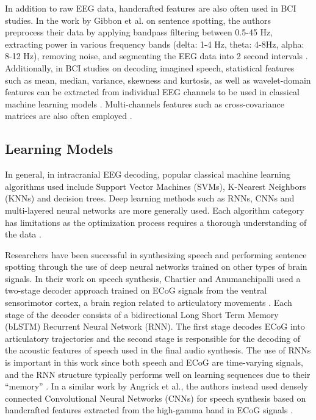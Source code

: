 \documentclass[format=sigconf, nonacm=true, review=false, screen=true]{acmart}
\begin{document}
In addition to raw EEG data, handcrafted features are also often used in BCI studies. In the work by Gibbon et al. on sentence spotting, the authors preprocess their data by applying bandpass filtering between 0.5-45 Hz, extracting power in various frequency bands (delta: 1-4 Hz, theta: 4-8Hz, alpha: 8-12 Hz), removing noise, and segmenting the EEG data into 2 second intervals \cite{gibbon2021machine}. Additionally, in BCI studies on decoding imagined speech, statistical features such as mean, median, variance, skewness and kurtosis, as well as wavelet-domain features can be extracted from individual EEG channels to be used in classical machine learning models \cite{panachakel2021}. Multi-channels features such as cross-covariance matrices are also often employed \cite{panachakel2021}.

\subsection{Learning Models}

In general, in intracranial EEG decoding, popular classical machine learning algorithms used include Support Vector Machines (SVMs), K-Nearest Neighbors (KNNs) and decision trees. Deep learning methods such as RNNs, CNNs and multi-layered neural networks are more generally used. Each algorithm category has limitations as the optimization process requires a thorough understanding of the data  \cite{mirchi_decoding_2022}.

Researchers have been successful in synthesizing speech and performing sentence spotting through the use of deep neural networks trained on other types of brain signals. In their work on speech synthesis, Chartier and Anumanchipalli used a two-stage decoder approach trained on ECoG signals from the ventral sensorimotor cortex, a brain region related to articulatory movements \cite{chartier2018encoding, anumanchipalli2018intelligible}. Each stage of the decoder consists of a bidirectional Long Short Term Memory (bLSTM) Recurrent Neural Network (RNN). The first stage decodes ECoG into articulatory trajectories and the second stage is responsible for the decoding of the acoustic features of speech used in the final audio synthesis. The use of RNNs is important in this work since both speech and ECoG are time-varying signals, and the RNN structure typically performs well on learning sequences due to their ``memory'' \cite{sarker2021}. In a similar work by Angrick et al., the authors instead used densely connected Convolutional Neural Networks (CNNs) for speech synthesis based on handcrafted features extracted from the high-gamma band in ECoG signals \cite{Angrick_2019}.
\end{document}
